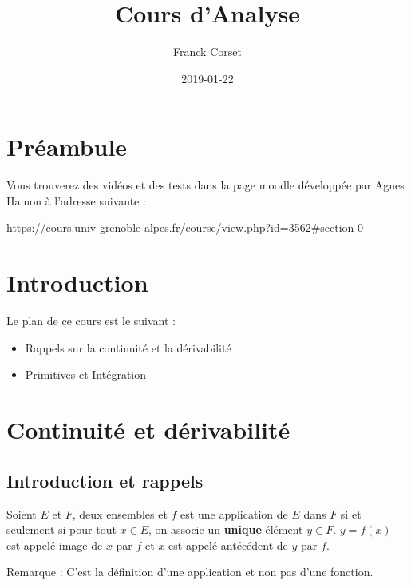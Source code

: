 \documentclass[]{book}
\title{Cours d'Analyse}
\author{Franck Corset}
\date{2019-01-22}
\theoremstyle{definition}
\theoremstyle{definition}
\theoremstyle{definition}
\theoremstyle{remark}
\let\BeginKnitrBlock\begin \let\EndKnitrBlock\end
\begin{document}
\maketitle

{
\setcounter{tocdepth}{1}
\tableofcontents
}
\hypertarget{preambule}{%
\chapter{Préambule}\label{preambule}}

Vous trouverez des vidéos et des tests dans la page moodle développée par Agnes Hamon à l'adresse suivante :

\url{https://cours.univ-grenoble-alpes.fr/course/view.php?id=3562\#section-0}

\hypertarget{intro}{%
\chapter{Introduction}\label{intro}}

Le plan de ce cours est le suivant :

\begin{itemize}
\item
  Rappels sur la continuité et la dérivabilité
\item
  Primitives et Intégration
\end{itemize}

\hypertarget{continuite-et-derivabilite}{%
\chapter{Continuité et dérivabilité}\label{continuite-et-derivabilite}}

\hypertarget{introduction-et-rappels}{%
\section{Introduction et rappels}\label{introduction-et-rappels}}

\BeginKnitrBlock{definition}[Application]
\protect\hypertarget{def:unnamed-chunk-1}{}{\label{def:unnamed-chunk-1} \iffalse (Application) \fi{} }Soient \(E\) et \(F\), deux ensembles et \(f\) est une application de \(E\) dans \(F\) si et seulement si pour tout \(x\in E\), on associe un \textbf{unique} élément \(y\in F\). \(y=f(x)\) est appelé image de \(x\) par \(f\) et \(x\) est appelé antécédent de \(y\) par \(f\).
\EndKnitrBlock{definition}

Remarque : C'est la définition d'une application et non pas d'une fonction.
\end{document}
